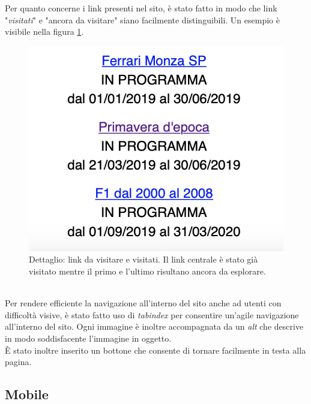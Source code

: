 Per quanto concerne i link presenti nel sito, è stato fatto in modo che link "\textit{visitati}" e "ancora da visitare" siano facilmente distinguibili. Un esempio è visibile nella figura \ref{fig:linkVisitatiDaVisitare}.
\begin{figure}[h]
	\begin{center}
		\includegraphics[scale=0.3]{Images/linkVisitatiDaVisitare.png}
		\caption{Dettaglio: link da visitare e visitati. Il link centrale è stato già visitato mentre il primo e l'ultimo risultano ancora da esplorare.}
		\label{fig:linkVisitatiDaVisitare}
	\end{center}
\end{figure}\\
Per rendere efficiente la navigazione all'interno del sito anche ad utenti con difficoltà visive, è stato fatto uso di \textit{tabindex} per consentire un'agile navigazione all'interno del sito. Ogni immagine è inoltre accompagnata da un \textit{alt} che descrive in modo soddisfacente l'immagine in oggetto.\\
È stato inoltre inserito un bottone che consente di tornare facilmente in testa alla pagina.

\subsection{Mobile}
